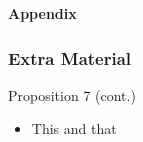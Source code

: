 \documentclass[ignorenonframetext, 9pt]{beamer}
\begin{document}
\appendix
\begin{frame}
  \centering
  \textbf{Appendix}
\end{frame}

\begin{frame}
  \frametitle{Extra Material}
  \label{slide:prop7}
\alert{Proposition 7 (cont.)}
\begin{itemize}
\item This and that
\end{itemize}
\end{frame}


%   
\end{document}
